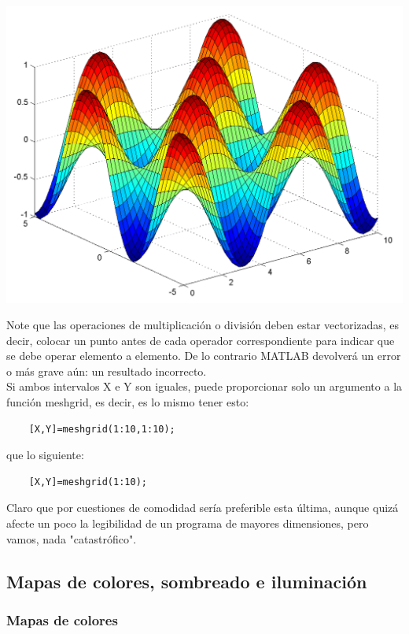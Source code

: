 \begin{center}
\includegraphics[scale=0.6]{src/ch4/img_4_8.png}
\end{center}

Note  que las operaciones de multiplicación o división deben estar vectorizadas, es decir, 
colocar un punto antes de cada operador correspondiente para indicar que se debe operar 
elemento a elemento. De lo contrario MATLAB devolverá un error o más grave aún: un resultado incorrecto.\\

Si ambos intervalos X e Y son iguales, puede proporcionar solo un argumento a la 
función meshgrid, es decir, es lo mismo tener esto:

\begin{verbatim}
	[X,Y]=meshgrid(1:10,1:10);
\end{verbatim}

que lo siguiente:

\begin{verbatim}
	[X,Y]=meshgrid(1:10);
\end{verbatim}

Claro que por cuestiones de comodidad sería preferible esta última, aunque quizá afecte 
un poco la legibilidad de un programa de mayores dimensiones, pero vamos, nada "catastrófico".

\subsection{Mapas de colores, sombreado e iluminación}

\subsubsection{Mapas de colores}

